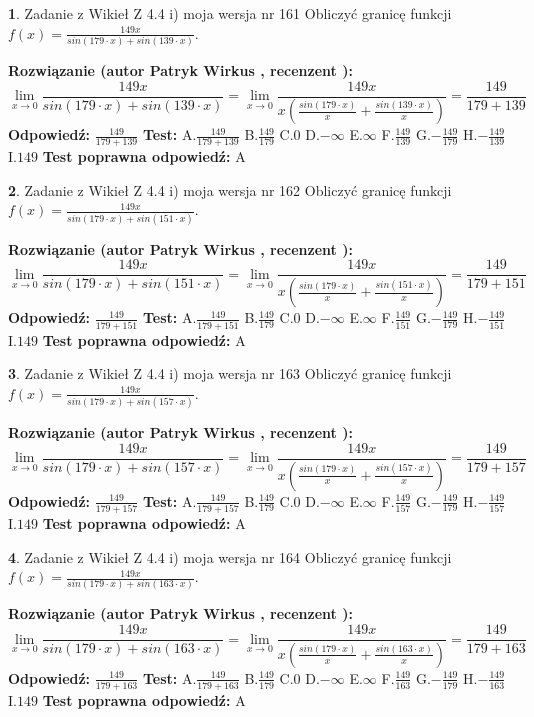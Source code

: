 \documentclass[12pt, a4paper]{article}
\theoremstyle{definition} %
\newtheorem{zad}{}
\newcommand{\zadStart}[1]{\begin{zad}#1\newline}
\newcommand{\zadStop}{\end{zad}}
\newcommand{\rozwStart}[2]{\noindent \textbf{Rozwiązanie (autor #1 , recenzent #2): }\newline}
\newcommand{\rozwStop}{\newline}
\newcommand{\odpStart}{\noindent \textbf{Odpowiedź:}\newline}
\newcommand{\odpStop}{\newline}
\newcommand{\testStart}{\noindent \textbf{Test:}\newline}
\newcommand{\testStop}{\newline}
\newcommand{\kluczStart}{\noindent \textbf{Test poprawna odpowiedź:}\newline}
\newcommand{\kluczStop}{\newline}
\begin{document}
\zadStart{Zadanie z Wikieł Z 4.4 i) moja wersja nr 161}
Obliczyć granicę funkcji $f(x)=\frac{149x}{sin(179\cdot x) +sin(139\cdot x)}$.
\zadStop
\rozwStart{Patryk Wirkus}{}
$$\lim\limits_{x\to 0}\frac{149x}{sin(179\cdot x) +sin(139\cdot x)}=\lim\limits_{x\to 0}\frac{149x}{x(\frac{sin(179\cdot x)}{x}+\frac{sin(139\cdot x)}{x})}=\frac{149}{179+139}$$
\rozwStop
\odpStart
$\frac{149}{179+139}$
\odpStop
\testStart
A.$\frac{149}{179+139}$
B.$\frac{149}{179}$
C.$0$
D.$-\infty$
E.$\infty$
F.$\frac{149}{139}$
G.$-\frac{149}{179}$
H.$-\frac{149}{139}$
I.$149$
\testStop
\kluczStart
A
\kluczStop



\zadStart{Zadanie z Wikieł Z 4.4 i) moja wersja nr 162}
Obliczyć granicę funkcji $f(x)=\frac{149x}{sin(179\cdot x) +sin(151\cdot x)}$.
\zadStop
\rozwStart{Patryk Wirkus}{}
$$\lim\limits_{x\to 0}\frac{149x}{sin(179\cdot x) +sin(151\cdot x)}=\lim\limits_{x\to 0}\frac{149x}{x(\frac{sin(179\cdot x)}{x}+\frac{sin(151\cdot x)}{x})}=\frac{149}{179+151}$$
\rozwStop
\odpStart
$\frac{149}{179+151}$
\odpStop
\testStart
A.$\frac{149}{179+151}$
B.$\frac{149}{179}$
C.$0$
D.$-\infty$
E.$\infty$
F.$\frac{149}{151}$
G.$-\frac{149}{179}$
H.$-\frac{149}{151}$
I.$149$
\testStop
\kluczStart
A
\kluczStop



\zadStart{Zadanie z Wikieł Z 4.4 i) moja wersja nr 163}
Obliczyć granicę funkcji $f(x)=\frac{149x}{sin(179\cdot x) +sin(157\cdot x)}$.
\zadStop
\rozwStart{Patryk Wirkus}{}
$$\lim\limits_{x\to 0}\frac{149x}{sin(179\cdot x) +sin(157\cdot x)}=\lim\limits_{x\to 0}\frac{149x}{x(\frac{sin(179\cdot x)}{x}+\frac{sin(157\cdot x)}{x})}=\frac{149}{179+157}$$
\rozwStop
\odpStart
$\frac{149}{179+157}$
\odpStop
\testStart
A.$\frac{149}{179+157}$
B.$\frac{149}{179}$
C.$0$
D.$-\infty$
E.$\infty$
F.$\frac{149}{157}$
G.$-\frac{149}{179}$
H.$-\frac{149}{157}$
I.$149$
\testStop
\kluczStart
A
\kluczStop



\zadStart{Zadanie z Wikieł Z 4.4 i) moja wersja nr 164}
Obliczyć granicę funkcji $f(x)=\frac{149x}{sin(179\cdot x) +sin(163\cdot x)}$.
\zadStop
\rozwStart{Patryk Wirkus}{}
$$\lim\limits_{x\to 0}\frac{149x}{sin(179\cdot x) +sin(163\cdot x)}=\lim\limits_{x\to 0}\frac{149x}{x(\frac{sin(179\cdot x)}{x}+\frac{sin(163\cdot x)}{x})}=\frac{149}{179+163}$$
\rozwStop
\odpStart
$\frac{149}{179+163}$
\odpStop
\testStart
A.$\frac{149}{179+163}$
B.$\frac{149}{179}$
C.$0$
D.$-\infty$
E.$\infty$
F.$\frac{149}{163}$
G.$-\frac{149}{179}$
H.$-\frac{149}{163}$
I.$149$
\testStop
\kluczStart
A
\kluczStop
\end{document}
